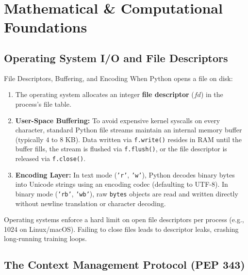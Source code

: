 \section{Mathematical \& Computational Foundations}

\subsection{Operating System I/O and File Descriptors}

\begin{definitionbox}{File Descriptors, Buffering, and Encoding}
 
When Python opens a file on disk:
\begin{enumerate}
    \item The operating system allocates an integer \textbf{file descriptor} ($fd$) in the process's file table.
    \item \textbf{User-Space Buffering:} To avoid expensive kernel syscalls on every character, standard Python file streams maintain an internal memory buffer (typically $4$ to $8$ KB). Data written via \texttt{f.write()} resides in RAM until the buffer fills, the stream is flushed via \texttt{f.flush()}, or the file descriptor is released via \texttt{f.close()}.
    \item \textbf{Encoding Layer:} In text mode (\texttt{'r'}, \texttt{'w'}), Python decodes binary bytes into Unicode strings using an encoding codec (defaulting to UTF-8). In binary mode (\texttt{'rb'}, \texttt{'wb'}), raw \texttt{bytes} objects are read and written directly without newline translation or character decoding.
\end{enumerate}
Operating systems enforce a hard limit on open file descriptors per process (e.g., 1024 on Linux/macOS). Failing to close files leads to descriptor leaks, crashing long-running training loops.
\end{definitionbox}

\subsection{The Context Management Protocol (PEP 343)}

